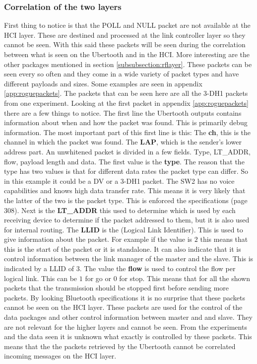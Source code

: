 \subsubsection{Correlation of the two layers}
First thing to notice is that the POLL and NULL packet are not available at the HCI layer. These are destined and processed at the link controller layer so they cannot be seen. With this said these packets will be seen during the correlation between what is seen on the Ubertooth and in the HCI. More interesting are the other packages mentioned in section \ref{subsubsection:rflayer}. These packets can be seen every so often and they come in a wide variety of packet types and have different payloads and sizes.
Some examples are seen in appendix \ref{app:roguepackets}. The packets that can be seen here are all the 3-DH1 packets from one experiment. Looking at the first packet in appendix \ref{app:roguepackets} there are a few things to notice. The first line the Ubertooth outputs contains information about when and how the packet was found. This is primarily debug information. The most important part of this first line is this:
The \textbf{ch}, this is the channel in which the packet was found.
The \textbf{LAP}, which is the sender's lower address part. \pend
An unwhitened packet is divided in a few fields. Type, LT\_ADDR, flow, payload length and data.
The first value is the \textbf{type}. The reason that the type has two values is that for different data rates the packet type can differ. So in this example it could be a DV or a 3-DH1 packet. The SW2 has no voice capabilities and knows high data transfer rate. This means it is very likely that the latter of the two is the packet type. This is enforced the specifications \cite{bt3.0}(page 308).
Next is the \textbf{LT\_ADDR} this used to determine which is used by each receiving device to determine if the packet addressed to them, but it is also used for internal routing.
The \textbf{LLID} is the (Logical Link Identifier). This is used to give information about the packet. For example if the value is $2$ this means that this is the start of the packet or it is standalone. It can also indicate that it is control information between the link manager of the master and the slave. This is indicated by a LLID of $3$.
The value the \textbf{flow} is used to control the flow per logical link. This can be $1$ for go or $0$ for stop. This means that for all the shown packets that the transmission should be stopped first before sending more packets. \pend
By looking Bluetooth specifications it is no surprise that these packets cannot be seen on the HCI layer. These packets are used for the control of the data packages and other control information between master and and slave. They are not relevant for the higher layers and cannot be seen. From the experiments and the data seen it is unknown what exactly is controlled by these packets. This means that the the packets retrieved by the Ubertooth cannot be correlated incoming messages on the HCI layer.